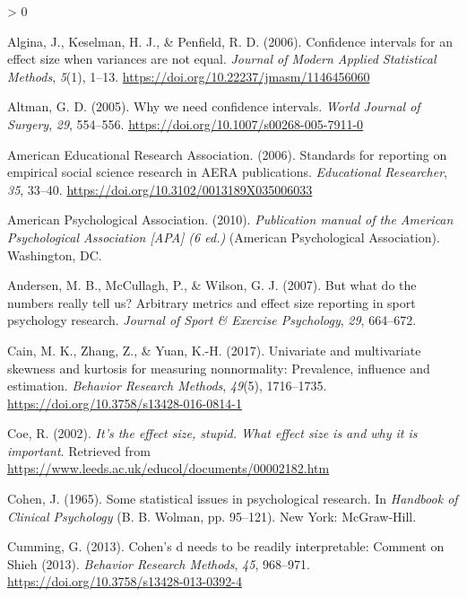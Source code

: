 \documentclass[
  english,
  man,floatsintext]{apa6}
\newlength{\cslhangindent}
\newenvironment{CSLReferences}[2] %
 {%
  \setlength{\parindent}{0pt}
  \ifodd #1 \everypar{\setlength{\hangindent}{\cslhangindent}}\ignorespaces\fi
  \ifnum #2 > 0
  \setlength{\parskip}{#2\baselineskip}
  \fi
 }%
 {}
\begin{document}
\hypertarget{refs}{}
\begin{CSLReferences}{1}{0}
\leavevmode\hypertarget{ref-Algina_et_al_2006}{}%
Algina, J., Keselman, H. J., \& Penfield, R. D. (2006). Confidence intervals for an effect size when variances are not equal. \emph{Journal of Modern Applied Statistical Methods}, \emph{5}(1), 1--13. \url{https://doi.org/10.22237/jmasm/1146456060}

\leavevmode\hypertarget{ref-Altman_2005}{}%
Altman, G. D. (2005). Why we need confidence intervals. \emph{{W}orld {J}ournal of {S}urgery}, \emph{29}, 554--556. \url{https://doi.org/10.1007/s00268-005-7911-0}

\leavevmode\hypertarget{ref-AERA_2006}{}%
American Educational Research Association. (2006). Standards for reporting on empirical social science research in AERA publications. \emph{{E}ducational {R}esearcher}, \emph{35}, 33--40. \url{https://doi.org/10.3102/0013189X035006033}

\leavevmode\hypertarget{ref-APA_2010}{}%
American Psychological Association. (2010). \emph{Publication manual of the {A}merican {P}sychological {A}ssociation {[}APA{]} (6 ed.)} (American Psychological Association). Washington, DC.

\leavevmode\hypertarget{ref-Andersen_et_al_2007}{}%
Andersen, M. B., McCullagh, P., \& Wilson, G. J. (2007). But what do the numbers really tell us? Arbitrary metrics and effect size reporting in sport psychology research. \emph{Journal of Sport \& Exercise Psychology}, \emph{29}, 664--672.

\leavevmode\hypertarget{ref-Cain_et_al_2017}{}%
Cain, M. K., Zhang, Z., \& Yuan, K.-H. (2017). Univariate and multivariate skewness and kurtosis for measuring nonnormality: Prevalence, influence and estimation. \emph{Behavior Research Methods}, \emph{49}(5), 1716--1735. \url{https://doi.org/10.3758/s13428-016-0814-1}

\leavevmode\hypertarget{ref-Coe_2002}{}%
Coe, R. (2002). \emph{It's the effect size, stupid. What effect size is and why it is important}. Retrieved from \url{https://www.leeds.ac.uk/educol/documents/00002182.htm}

\leavevmode\hypertarget{ref-Cohen_1965}{}%
Cohen, J. (1965). Some statistical issues in psychological research. In \emph{Handbook of {C}linical {P}sychology} (B. B. Wolman, pp. 95--121). New York: McGraw-Hill.

\leavevmode\hypertarget{ref-Cumming_2013}{}%
Cumming, G. (2013). Cohen's d needs to be readily interpretable: Comment on {S}hieh (2013). \emph{{B}ehavior {R}esearch {M}ethods}, \emph{45}, 968--971. \url{https://doi.org/10.3758/s13428-013-0392-4}


\end{CSLReferences}
\end{document}
